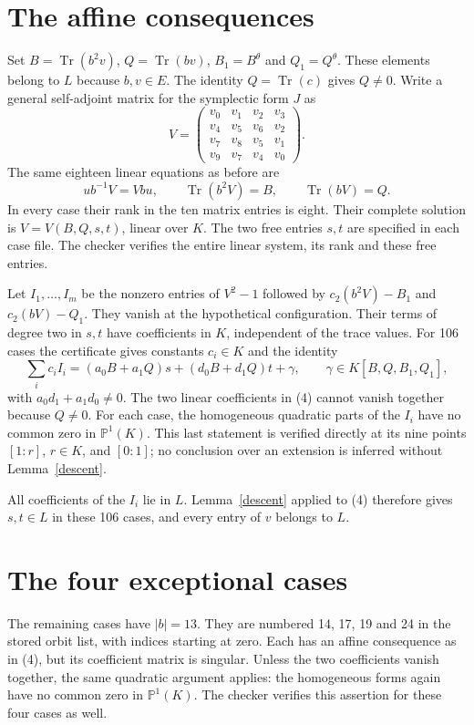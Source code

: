 \documentclass[11pt,a4paper]{article}
\newcommand{\Tr}{\operatorname{Tr}}
\begin{document}
\section*{The affine consequences}

Set $B=\Tr(b^2v)$, $Q=\Tr(bv)$, $B_1=B^\theta$ and
$Q_1=Q^\theta$. These elements belong to $L$ because $b,v\in E$.
The identity $Q=\Tr(c)$ gives $Q\ne0$. Write a general self-adjoint
matrix for the symplectic form $J$ as
\[
 V=\begin{pmatrix}
 v_0&v_1&v_2&v_3\\v_4&v_5&v_6&v_2\\
 v_7&v_8&v_5&v_1\\v_9&v_7&v_4&v_0
 \end{pmatrix}.
\]
The same eighteen linear equations as before are
\[
 ub^{-1}V=Vbu,\qquad \Tr(b^2V)=B,\qquad\Tr(bV)=Q.     \tag{3}
\]
In every case their rank in the ten matrix entries is eight.
Their complete solution is $V=V(B,Q,s,t)$, linear over $K$.
The two free entries $s,t$ are specified in each case file. The checker
verifies the entire linear system, its rank and these free entries.

Let $I_1,\ldots,I_m$ be the nonzero entries of $V^2-1$ followed by
$c_2(b^2V)-B_1$ and $c_2(bV)-Q_1$. They vanish at the hypothetical
configuration. Their terms of degree two in $s,t$ have coefficients
in $K$, independent of the trace values. For 106 cases the certificate
gives constants $c_i\in K$ and the identity
\[
 \sum_i c_iI_i=(a_0B+a_1Q)s+(d_0B+d_1Q)t+\gamma,
              \qquad \gamma\in K[B,Q,B_1,Q_1],         \tag{4}
\]
with $a_0d_1+a_1d_0\ne0$. The two linear coefficients in (4) cannot
vanish together because $Q\ne0$. For each case, the homogeneous
quadratic parts of the $I_i$ have no common zero in $\mathbb P^1(K)$.
This last statement is verified directly at its nine points
$[1:r]$, $r\in K$, and $[0:1]$; no conclusion over an extension is
inferred without Lemma~\ref{descent}.

All coefficients of the $I_i$ lie in $L$. Lemma~\ref{descent} applied
to (4) therefore gives $s,t\in L$ in these 106 cases, and every
entry of $v$ belongs to $L$.

\section*{The four exceptional cases}

The remaining cases have $|b|=13$. They are numbered 14, 17, 19 and
24 in the stored orbit list, with indices starting at zero. Each has
an affine consequence as in (4), but its coefficient matrix is
singular. Unless the two coefficients vanish together, the same
quadratic argument applies: the homogeneous forms again have no
common zero in $\mathbb P^1(K)$. The checker verifies this assertion
for these four cases as well.
\end{document}
